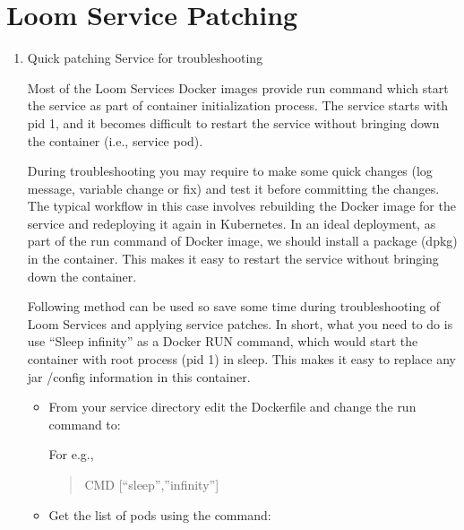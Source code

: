 \documentclass[letterpaper,10pt,english]{sphinxmanual}
\begin{document}
\section{Loom Service Patching}
\label{\detokenize{loom_installation_guide:loom-service-patching}}\begin{enumerate}
\item {} 
Quick patching Service for troubleshooting

Most of the Loom Services Docker images provide run command which start the service as part of container initialization process. The service starts with pid 1, and it becomes difficult to restart the service without bringing down the container (i.e., service pod).

During troubleshooting you may require to make some quick changes (log message, variable change or fix) and test it before committing the changes. The typical workflow in this case involves rebuilding the Docker image for the service and redeploying it again in Kubernetes. In an ideal deployment, as part of the run command of Docker image, we should install a package (dpkg) in the container. This makes it easy to restart the service without bringing down the container.

Following method can be used so save some time during troubleshooting of Loom Services and applying service patches. In short, what you need to do is use “Sleep infinity” as a Docker RUN command, which would start the container with root process (pid 1) in sleep.  This makes it easy to replace any jar /config information in this container.
\begin{itemize}
\item {} 
From your service directory edit the Dockerfile and change the run command to:

\begin{sphinxVerbatim}[commandchars=\\\{\}]
 
\end{sphinxVerbatim}

For e.g.,
\begin{quote}

CMD {[}“sleep”,”infinity”{]}
\end{quote}

\item {} 
Get the list of pods using the command:

\begin{sphinxVerbatim}[commandchars=\\\{\}]
 
\end{sphinxVerbatim}


\end{itemize}
\end{enumerate}
\end{document}
